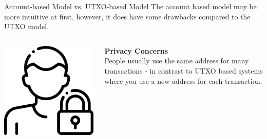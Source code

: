 \documentclass[handout]{beamer}
\begin{document}
\begin{frame}{Account-based Model vs. UTXO-based Model}
	The account based model may be more intuitive at first, however, it does have some drawbacks compared to the UTXO model. \\ 
	\vspace{2em}
		\begin{columns}[T]
			\begin{column}{0.25\textwidth}
				\center
				\includegraphics[scale=0.1]{../assets/images/privacy.png}
			\end{column}
			\begin{column}{0.8\textwidth}
				\textbf{Privacy Concerns}\\
People usually use the same address for many transactions - in contrast to UTXO based systems where you use a new address for each transaction. \\
\href{https://etherscan.io/address/0x8cbcb10a365a5e26dfcd41b1257fda54bc604c70}{}
			\end{column}
		\end{columns}	
\end{frame}
\end{document}
